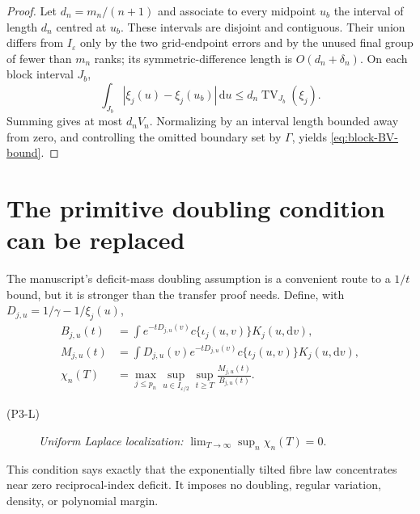 \documentclass[11pt]{article}
\theoremstyle{definition}\newtheorem{definition}[theorem]{Definition}
\newcommand{\I}{I_\varepsilon}
\newcommand{\TV}{\operatorname{TV}}
\begin{document}
\begin{proof}
Let $d_n=m_n/(n+1)$ and associate to every midpoint $u_b$ the interval of
length $d_n$ centred at $u_b$.  These intervals are disjoint and contiguous.
Their union differs from $\I$ only by the two grid-endpoint errors and by the
unused final group of fewer than $m_n$ ranks; its symmetric-difference length
is $O(d_n+\delta_n)$.  On each block interval $J_b$,
\[
 \int_{J_b}|\xi_j(u)-\xi_j(u_b)|\,\mathrm du
 \le d_n\TV_{J_b}(\xi_j).
\]
Summing gives at most $d_nV_n$.  Normalizing by an interval length bounded
away from zero, and controlling the omitted boundary set by $\Gamma$, yields
\eqref{eq:block-BV-bound}.
\end{proof}

\section{The primitive doubling condition can be replaced}

The manuscript's deficit-mass doubling assumption is a convenient route to a
$1/t$ bound, but it is stronger than the transfer proof needs.  Define, with
$D_{j,u}=1/\gamma-1/\xi_j(u)$,
\begin{align*}
 B_{j,u}(t)
 &=\int e^{-tD_{j,u}(v)}c\{\iota_j(u,v)\}K_j(u,\mathrm dv),\\
 M_{j,u}(t)
 &=\int D_{j,u}(v)e^{-tD_{j,u}(v)}
   c\{\iota_j(u,v)\}K_j(u,\mathrm dv),\\
 \chi_n(T)
 &=\max_{j\le p_n}\sup_{u\in I_{\varepsilon/2}}
   \sup_{t\ge T}\frac{M_{j,u}(t)}{B_{j,u}(t)}.
\end{align*}

\begin{description}
\item[(P3-L)] \emph{Uniform Laplace localization:}
$\lim_{T\to\infty}\sup_n\chi_n(T)=0$.
\end{description}

This condition says exactly that the exponentially tilted fibre law
concentrates near zero reciprocal-index deficit.  It imposes no doubling,
regular variation, density, or polynomial margin.
\end{document}
